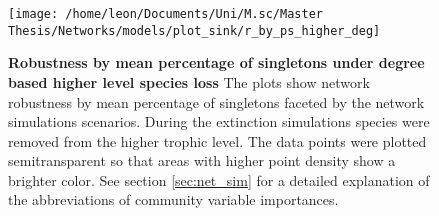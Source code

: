 \documentclass[12pt,a4paper]{article}
\begin{document}
\begin{figure}[H]
	 \centering
	 \texttt{[image: /home/leon/Documents/Uni/M.sc/Master Thesis/Networks/models/plot\_sink/r\_by\_ps\_higher\_deg]}
	 	 \captionsetup{width = .8\textwidth}
	 \caption[Robustness by mean percentage of singletons under degree based higher level species loss]{\textbf{Robustness by mean percentage of singletons under degree based higher level species loss} The plots show network robustness by mean percentage of singletons faceted by the network simulations scenarios. During the extinction simulations species were removed from the higher trophic level. The data points were plotted semitransparent so that areas with higher point density show a brighter color. See section \ref{sec:net_sim} for a detailed explanation of the abbreviations of community variable importances.}
	 \label{fig:r_by_ps_higher_deg}
\end{figure}




%
%
\end{document}
